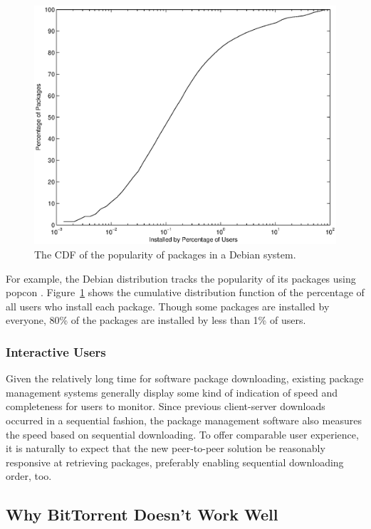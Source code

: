 \documentclass[conference]{IEEEtran}
\begin{document}
\begin{figure}
\centering
\includegraphics[width=\columnwidth]{apt_p2p_popularity-cdf.eps}
\caption{The CDF of the popularity of packages in a Debian system.}
\label{popularity_CDF}
\end{figure}

For example, the Debian distribution tracks the popularity of its
packages using popcon \cite{popcon}. Figure~\ref{popularity_CDF}
shows the cumulative distribution function of the percentage of all
users who install each package. Though some packages are installed
by everyone, 80\% of the packages are installed by less than 1\% of
users.

\subsubsection{Interactive Users}

Given the relatively long time for software package downloading, existing package management systems generally display
some kind of indication of speed and completeness for users to
monitor. Since previous client-server downloads occurred in a sequential
fashion, the package management software also measures the speed
based on sequential downloading. To offer comparable user experience, it is naturally to expect that
the new peer-to-peer solution be reasonably responsive at retrieving packages,
preferably enabling sequential downloading order, too.

\subsection{Why BitTorrent Doesn't Work Well}
\label{bittorrent}
\end{document}
